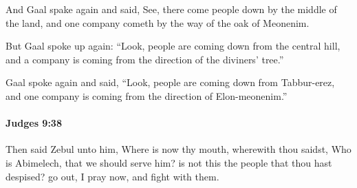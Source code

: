 			\begin{versebox}
					\item[BHS] 
					\item[ASV] And Gaal spake again and said, See, there come people down by the middle of the land, and one company cometh by the way of the oak of Meonenim.
					\item[NIV] But Gaal spoke up again: “Look, people are coming down from the central hill, and a company is coming from the direction of the diviners’ tree.”
					\item[NRSV] Gaal spoke again and said, “Look, people are coming down from Tabbur-erez, and one company is coming from the direction of Elon-meonenim.”
			\end{versebox}

		\paragraph{Judges 9:38} %
			\label{JUDGES-9-38}

			Then said Zebul unto him, Where is now thy mouth, wherewith thou saidst, Who is Abimelech, that we should serve him? is not this the people that thou hast despised? go out, I pray now, and fight with them.

